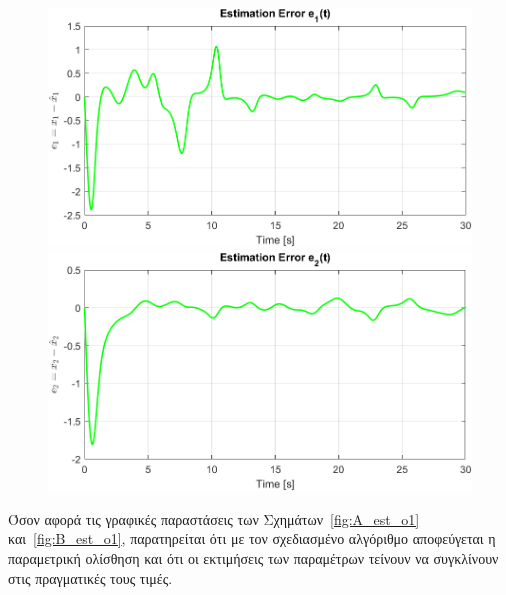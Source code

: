 \documentclass[12pt]{article} %
\numberwithin{equation}{section}  %
\begin{document}
\begin{figure}[ht!]
    \centering
    \begin{minipage}{0.48\textwidth}
        \centering
        \includegraphics[width=0.8\linewidth]{plots/plot6_3_e1_o1.png}
    \end{minipage}
    \hfill
    \begin{minipage}{0.48\textwidth}
        \centering
        \includegraphics[width=0.8\linewidth]{plots/plot6_4_e2_o1.png}
    \end{minipage}
    
    \caption{}
    \label{fig:x_err_o1}
\end{figure}

Όσον αφορά τις γραφικές παραστάσεις των Σχημάτων~\ref{fig:A_est_o1} και~\ref{fig:B_est_o1}, 
παρατηρείται ότι με τον σχεδιασμένο αλγόριθμο αποφεύγεται η παραμετρική ολίσθηση και ότι 
οι εκτιμήσεις των παραμέτρων τείνουν να συγκλίνουν στις πραγματικές τους τιμές.
\end{document}
